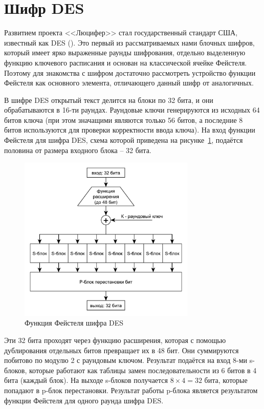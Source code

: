 \section{Шифр DES}

Развитием проекта <<Люцифер>> стал государственный стандарт США, известный как DES (). Это первый из рассматриваемых нами блочных шифров, который имеет ярко выраженные раунды шифрования, отдельно выделенную функцию ключевого расписания и основан на классической ячейке Фейстеля. Поэтому для знакомства с шифром достаточно рассмотреть устройство функции Фейстеля как основного элемента, отличающего данный шифр от аналогичных.

В шифре DES открытый текст делится на блоки по 32 бита, и они обрабатываются в 16-ти раундах. Раундовые ключи генерируются из исходных 64 битов ключа (при этом значащими являются только 56 битов, а последние 8 битов используются для проверки корректности ввода ключа). На вход функции Фейстеля для шифра DES, схема которой приведена на рисунке~\ref{fig:des}, подаётся половина от размера входного блока -- 32 бита.

\begin{figure}[!htb]
    \centering
    \includegraphics[width=0.75\textwidth]{pic/des}
    \caption{Функция Фейстеля шифра DES\label{fig:des}}
\end{figure}

Эти 32 бита проходят через функцию расширения, которая с помощью дублирования отдельных битов превращает их в 48 бит. Они суммируются побитово по модулю 2 с раундовым ключом. Результат подаётся на вход 8-ми s-блоков, которые работают как таблицы замен последовательности из 6 битов в 4 бита (каждый блок). На выходе s-блоков получается $8 \times 4 = 32$ бита, которые попадают в p-блок перестановки. Результат работы p-блока является результатом функции Фейстеля для одного раунда шифра DES.

